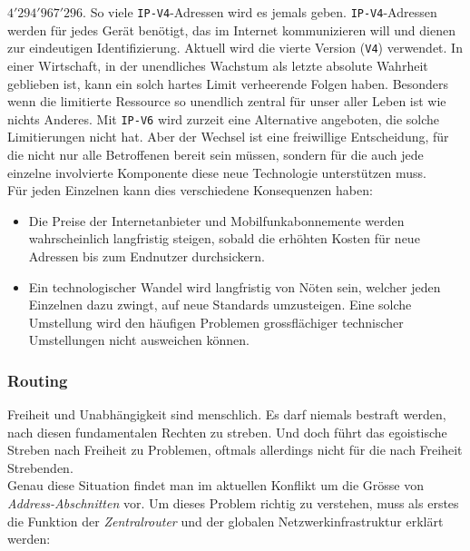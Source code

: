 \documentclass[11pt]{article}
\begin{document}
\noindent \(4'294'967'296\). So viele \texttt{IP-V4}-Adressen wird es jemals
geben. \texttt{IP-V4}-Adressen werden für jedes Gerät benötigt, das im Internet
kommunizieren will und dienen zur eindeutigen Identifizierung. Aktuell
wird die vierte Version (\texttt{V4}) verwendet. In einer Wirtschaft, in der
unendliches Wachstum als letzte absolute Wahrheit geblieben ist, kann
ein solch hartes Limit verheerende Folgen haben. Besonders wenn die
limitierte Ressource so unendlich zentral für unser aller Leben ist
wie nichts Anderes. Mit \texttt{IP-V6} wird zurzeit eine Alternative angeboten,
die solche Limitierungen nicht hat. Aber der Wechsel ist eine
freiwillige Entscheidung, für die nicht nur alle Betroffenen bereit
sein müssen, sondern für die auch jede einzelne involvierte Komponente
diese neue Technologie unterstützen muss.\\

\noindent Für jeden Einzelnen kann dies verschiedene Konsequenzen
haben:
\begin{itemize}
\item Die Preise der Internetanbieter und Mobilfunkabonnemente werden
wahrscheinlich langfristig steigen, sobald die erhöhten Kosten für
neue Adressen bis zum Endnutzer durchsickern.
\item Ein technologischer Wandel wird langfristig von Nöten sein, welcher
jeden Einzelnen dazu zwingt, auf neue Standards umzusteigen. Eine
solche Umstellung wird den häufigen Problemen grossflächiger
technischer Umstellungen nicht ausweichen können.
\end{itemize}
\subsubsection{Routing}
\label{sec:org7e3d75a}
Freiheit und Unabhängigkeit sind menschlich. Es darf niemals bestraft
werden, nach diesen fundamentalen Rechten zu streben. Und doch führt
das egoistische Streben nach Freiheit zu Problemen, oftmals allerdings
nicht für die nach Freiheit Strebenden.\\

\noindent Genau diese Situation findet man im aktuellen Konflikt um
die Grösse von \emph{Address-Abschnitten} vor. Um dieses Problem richtig zu
verstehen, muss als erstes die Funktion der \emph{Zentralrouter} und der
globalen Netzwerkinfrastruktur erklärt werden:\\
\end{document}
